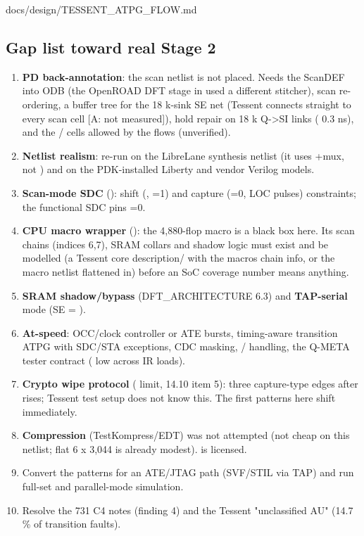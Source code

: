 \begin{relocated}{docs/design/TESSENT_ATPG_FLOW.md}
\subsection{Gap list toward real Stage 2}\label{tm:flow:tessent-atpg:9-gap-list-toward-real-stage-2}

\begin{enumerate}
\def\labelenumi{\arabic{enumi}.}
\tightlist
\item
  \textbf{PD back-annotation}: the scan netlist is not placed. Needs the
  ScanDEF into ODB (the OpenROAD DFT stage in  used a
  different stitcher), scan re-ordering, a buffer tree for the 18 k-sink
  SE net (Tessent connects  straight to every scan cell
  {[}A: not measured{]}), hold repair on 18 k Q-\textgreater SI links
  ( 0.3 ns), and the
  / cells allowed by the flow\textquotesingle s
   (unverified).
\item
  \textbf{Netlist realism}: re-run on the LibreLane synthesis netlist
  (it uses +mux, not ) and on the PDK-installed
  Liberty and vendor Verilog models.
\item
  \textbf{Scan-mode SDC} (): shift (,
  =1) and capture (=0, LOC pulses)
  constraints; the functional SDC pins =0.
\item
  \textbf{CPU macro wrapper} (): the 4,880-flop macro is a
  black box here. Its scan chains (indices 6,7), SRAM collars and shadow
  logic must exist and be modelled (a Tessent core
  description/ with the macro\textquotesingle s
  chain info, or the macro netlist flattened in) before an SoC coverage
  number means anything.
\item
  \textbf{SRAM shadow/\allowbreak{}bypass}
  (DFT\_\allowbreak{}ARCHITECTURE 6.3) and \textbf{TAP-serial} mode (SE
  = ).
\item
  \textbf{At-speed}: OCC/clock controller or ATE bursts, timing-aware
  transition ATPG with SDC/STA exceptions, CDC masking,
  / handling, the Q-META tester
  contract ( low across IR loads).
\item
  \textbf{Crypto wipe protocol} ( limit, 14.10 item 5):
  three capture-type edges after  rises; Tessent test
  setup does not know this. The first patterns here shift immediately.
\item
  \textbf{Compression} (TestKompress/\allowbreak{}EDT) was not attempted
  (not cheap on this netlist; flat 6 x 3,044 is already modest).
   is licensed.
\item
  Convert the patterns for an ATE/JTAG path (SVF/STIL via TAP) and run
  full-set and parallel-mode simulation.
\item
  Resolve the 731 C4 notes (finding 4) and the Tessent "unclassified AU"
  (14.7 \% of transition faults).
\end{enumerate}


\end{relocated}
